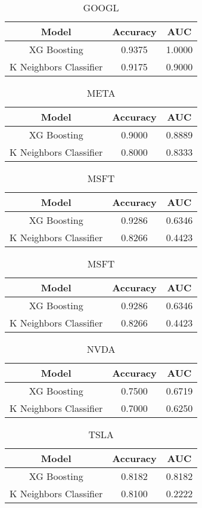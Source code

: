 \documentclass{article}
\begin{document}
\begin{table}[h]
\centering
\begin{tabular}{ccc}
\hline
\textbf{Model} & \textbf{Accuracy} & \textbf{AUC} \\ \hline
XG Boosting & 0.9375 & 1.0000 \\
K Neighbors Classifier & 0.9175 & 0.9000 \\ \hline
\end{tabular}
\caption{GOOGL}
\end{table}
\begin{table}[h]
\centering
\begin{tabular}{ccc}
\hline
\textbf{Model} & \textbf{Accuracy} & \textbf{AUC} \\ \hline
XG Boosting & 0.9000  & 0.8889 \\
K Neighbors Classifier & 0.8000 & 0.8333 \\ \hline
\end{tabular}
\caption{META}
\end{table}
\begin{table}[h]
\centering
\begin{tabular}{ccc}
\hline
\textbf{Model} & \textbf{Accuracy} & \textbf{AUC} \\ \hline
XG Boosting & 0.9286  & 0.6346 \\
K Neighbors Classifier & 0.8266 & 0.4423 \\ \hline
\end{tabular}
\caption{MSFT}
\end{table}
\begin{table}[h]
\centering
\begin{tabular}{ccc}
\hline
\textbf{Model} & \textbf{Accuracy} & \textbf{AUC} \\ \hline
XG Boosting & 0.9286  & 0.6346 \\
K Neighbors Classifier & 0.8266 & 0.4423 \\ \hline
\end{tabular}
\caption{MSFT}
\end{table}
\begin{table}[h]
\centering
\begin{tabular}{ccc}
\hline
\textbf{Model} & \textbf{Accuracy} & \textbf{AUC} \\ \hline
XG Boosting & 0.7500  & 0.6719	 \\
K Neighbors Classifier & 0.7000 & 0.6250 \\ \hline
\end{tabular}
\caption{NVDA}
\end{table}
\begin{table}[h]
\centering
\begin{tabular}{ccc}
\hline
\textbf{Model} & \textbf{Accuracy} & \textbf{AUC} \\ \hline
XG Boosting & 0.8182  & 0.8182	 \\
K Neighbors Classifier & 0.8100 & 0.2222 \\ \hline
\end{tabular}
\caption{TSLA}
\end{table}
\end{document}
